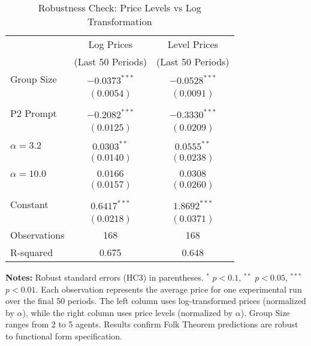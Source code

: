 \begin{table}[H]
    \centering
    \caption{Robustness Check: Price Levels vs Log Transformation}
    \label{tab:robustness_price_specification}
    \begin{threeparttable}
    \begin{tabular}{lcc}
    \toprule
     & Log Prices & Level Prices \\
     & (Last 50 Periods) & (Last 50 Periods) \\
    \midrule
    Group Size & $-0.0373^{***}$ & $-0.0528^{***}$ \\
     & $(0.0054)$ & $(0.0091)$ \\
    \\
    P2 Prompt & $-0.2082^{***}$ & $-0.3330^{***}$ \\
     & $(0.0125)$ & $(0.0209)$ \\
    \\
    $\alpha = 3.2$ & $0.0303^{**}$ & $0.0555^{**}$ \\
     & $(0.0140)$ & $(0.0238)$ \\
    \\
    $\alpha = 10.0$ & $0.0166$ & $0.0308$ \\
     & $(0.0157)$ & $(0.0260)$ \\
    \\
    Constant & $0.6417^{***}$ & $1.8692^{***}$ \\
     & $(0.0218)$ & $(0.0371)$ \\
    \midrule
    Observations & 168 & 168 \\
    R-squared & 0.675 & 0.648 \\
    \bottomrule
    \end{tabular}
    \begin{tablenotes}[flushleft]
    \footnotesize
    \item \textbf{Notes:} Robust standard errors (HC3) in parentheses. $^{*}$ $p<0.1$, $^{**}$ $p<0.05$, $^{***}$ $p<0.01$. Each observation represents the average price for one experimental run over the final 50 periods. The left column uses log-transformed prices (normalized by $\alpha$), while the right column uses price levels (normalized by $\alpha$). Group Size ranges from 2 to 5 agents. Results confirm Folk Theorem predictions are robust to functional form specification.
    \end{tablenotes}
    \end{threeparttable}
\end{table}


